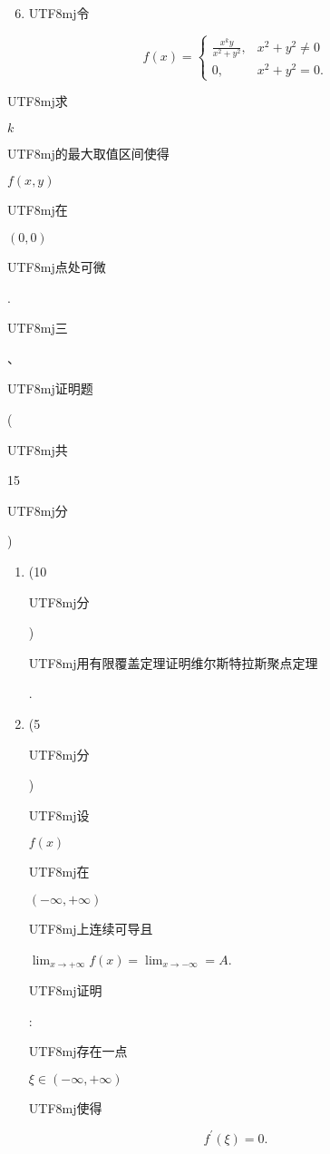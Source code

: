 \documentclass[10pt]{article}
\begin{document}
\begin{enumerate}
  \setcounter{enumi}{5}
  \item \begin{CJK}{UTF8}{mj}令\end{CJK}
\end{enumerate}
$$
f(x)= \begin{cases}\frac{x^{k} y}{x^{2}+y^{2}}, & x^{2}+y^{2} \neq 0 \\ 0, & x^{2}+y^{2}=0 .\end{cases}
$$
\begin{CJK}{UTF8}{mj}求\end{CJK} $k$ \begin{CJK}{UTF8}{mj}的最大取值区间使得\end{CJK} $f(x, y)$ \begin{CJK}{UTF8}{mj}在\end{CJK} $(0,0)$ \begin{CJK}{UTF8}{mj}点处可微\end{CJK}.

\begin{CJK}{UTF8}{mj}三\end{CJK}、\begin{CJK}{UTF8}{mj}证明题\end{CJK}(\begin{CJK}{UTF8}{mj}共\end{CJK} 15 \begin{CJK}{UTF8}{mj}分\end{CJK})

\begin{enumerate}
  \item (10 \begin{CJK}{UTF8}{mj}分\end{CJK}) \begin{CJK}{UTF8}{mj}用有限覆盖定理证明维尔斯特拉斯聚点定理\end{CJK}.

  \item (5 \begin{CJK}{UTF8}{mj}分\end{CJK}) \begin{CJK}{UTF8}{mj}设\end{CJK} $f(x)$ \begin{CJK}{UTF8}{mj}在\end{CJK} $(-\infty,+\infty)$ \begin{CJK}{UTF8}{mj}上连续可导且\end{CJK} $\lim _{x \rightarrow+\infty} f(x)=\lim _{x \rightarrow-\infty}=A$. \begin{CJK}{UTF8}{mj}证明\end{CJK}: \begin{CJK}{UTF8}{mj}存在一点\end{CJK} $\xi \in(-\infty,+\infty)$ \begin{CJK}{UTF8}{mj}使得\end{CJK}

\end{enumerate}
$$
f^{\prime}(\xi)=0 .
$$
\end{document}
